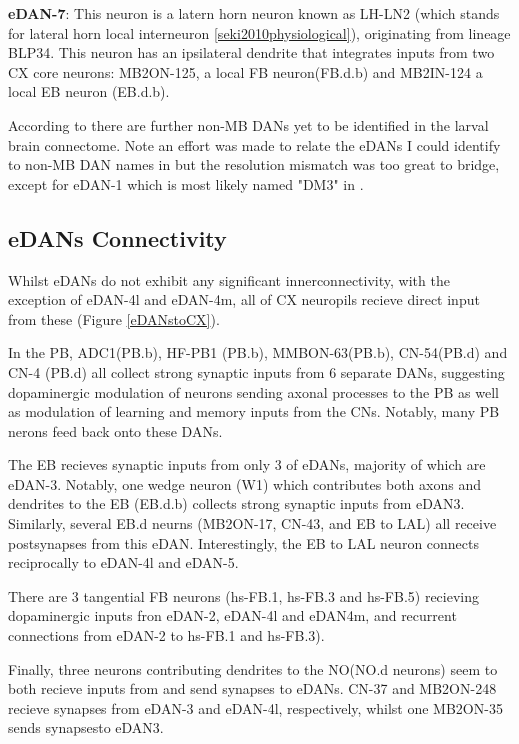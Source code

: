     \textbf{eDAN-7}: 
    This neuron is a latern horn neuron known as LH-LN2 (which stands for lateral horn local interneuron \ref{seki2010physiological}), originating from lineage BLP34. This neuron has an ipsilateral dendrite that integrates inputs from two CX core neurons: MB2ON-125, a local FB neuron(FB.d.b) and MB2IN-124 a local EB neuron (EB.d.b). 

    According to \citep{selcho2009thgal4} there are further non-MB DANs yet to be identified in the larval brain connectome. Note an effort was made to relate the eDANs I could identify to non-MB DAN names in \citep{selcho2009thgal4} but the resolution mismatch was too great to bridge, except for eDAN-1 which is most likely named "DM3" in \citep{selcho2009thgal4}.

    \subsection{eDANs Connectivity}
     Whilst eDANs do not exhibit any significant innerconnectivity, with the exception of eDAN-4l and eDAN-4m, all of CX neuropils recieve direct input from these (Figure \ref{eDANstoCX}). 

    In the PB, ADC1(PB.b), HF-PB1 (PB.b), MMBON-63(PB.b), CN-54(PB.d) and CN-4 (PB.d) all collect strong synaptic inputs from 6 separate DANs,  suggesting dopaminergic modulation of neurons sending axonal processes to the PB as well as modulation of learning and memory inputs from the CNs.  Notably, many PB nerons feed back onto these DANs.

    The EB recieves synaptic inputs from only 3 of eDANs, majority of which are eDAN-3. Notably, one wedge neuron (W1) which contributes both axons and dendrites to the EB (EB.d.b) collects strong synaptic inputs from eDAN3. Similarly, several EB.d neurns (MB2ON-17, CN-43, and EB to LAL) all receive postsynapses from this eDAN. Interestingly, the EB to LAL neuron connects reciprocally to eDAN-4l and eDAN-5. 

    There are 3 tangential FB neurons (hs-FB.1, hs-FB.3 and hs-FB.5) recieving dopaminergic inputs fron eDAN-2, eDAN-4l and eDAN4m, and recurrent connections from eDAN-2 to hs-FB.1 and hs-FB.3). 

    Finally, three neurons contributing dendrites to the NO(NO.d neurons) seem to both recieve inputs from and send synapses to eDANs. CN-37 and MB2ON-248 recieve synapses from eDAN-3 and eDAN-4l, respectively, whilst one MB2ON-35 sends synapsesto eDAN3. 


